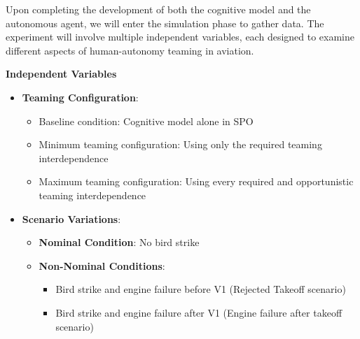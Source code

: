 \documentclass[12pt,a4paper]{article} %
\begin{document}
	Upon completing the development of both the cognitive model and the autonomous agent, we will enter the simulation phase to gather data. The experiment will involve multiple independent variables, each designed to examine different aspects of human-autonomy teaming in aviation.
	
	\textbf{Independent Variables}
	\begin{itemize}
	\item \textbf{Teaming Configuration}:
	\begin{itemize}
	\item Baseline condition: Cognitive model alone in SPO
	\item Minimum teaming configuration: Using only the required teaming interdependence
	\item Maximum teaming configuration: Using every required and opportunistic teaming interdependence
	\end{itemize}
	\item \textbf{Scenario Variations}:
	\begin{itemize}
	\item \textbf{Nominal Condition}: No bird strike
	\item \textbf{Non-Nominal Conditions}:
	\begin{itemize}
	\item Bird strike and engine failure before V1 (Rejected Takeoff scenario)
	\item Bird strike and engine failure after V1 (Engine failure after takeoff scenario)
	\end{itemize}
	\end{itemize}
	\end{itemize}
	
\end{document}
